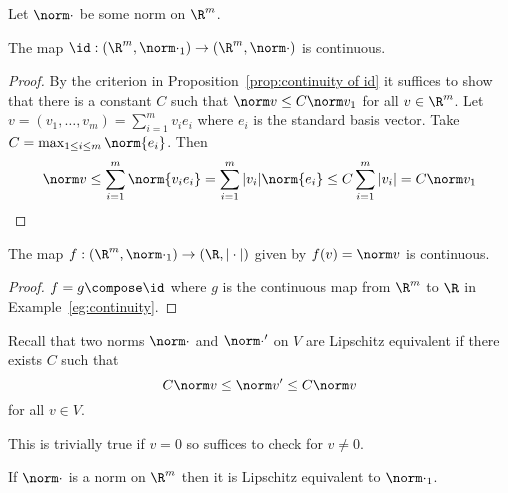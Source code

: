 \documentclass[a4paper]{article}
\theoremstyle{definition}
\begin{document}
\begin{application}
  Let \(\norm \cdot\) be some norm on \(\R^m\).
  
  \begin{lemma}
    The map \(\id: (\R^m, \norm \cdot_1) \to (\R^m, \norm \cdot)\) is continuous.
  \end{lemma}

  \begin{proof}
    By the criterion in Proposition~\ref{prop:continuity of id} it suffices to show that there is a constant \(C\) such that \(\norm v \leq C \norm v_1\) for all \(v\in \R^m\). Let \(v = (v_1,\dots,v_m) = \sum_{i=1}^{m}v_ie_i \) where \(e_i\) is the standard basis vector. Take \(C = \max_{1\leq i\leq m}\norm{e_i}\). Then
    \[
      \norm v \leq \sum_{i=1}^{m}\norm{v_ie_i} = \sum_{i=1}^{m}|v_i| \norm{e_i} \leq C \sum_{i=1}^{m}|v_i| = C \norm v_1
    \]
  \end{proof}

  \begin{corollary}
    The map \(f:(\R^m, \norm \cdot_1) \to (\R, |\cdot|)\) given by \(f(v) = \norm v\) is continuous.
  \end{corollary}

  \begin{proof}
    \(f = g\compose \id\) where \(g\) is the continuous map from \(\R^m\) to \(\R\) in Example~\ref{eg:continuity}.
  \end{proof}
\end{application}

Recall that two norms \(\norm \cdot\) and \(\norm \cdot'\) on \(V\) are Lipschitz equivalent if there exists \(C\) such that
\[
  C\norm v \leq \norm v' \leq C \norm v
\]
for all \(v\in V\).

\begin{remark}
  This is trivially true if \(v=0\) so suffices to check for \(v\neq0\).
\end{remark}

\begin{theorem}
  If \(\norm \cdot\) is a norm on \(\R^m\) then it is Lipschitz equivalent to \(\norm \cdot_1\).
\end{theorem}
\end{document}
